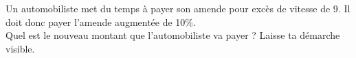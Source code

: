 %
%
    Un automobiliste met du temps à payer son amende pour excès de vitesse de \SI{9}{\sieuro}. Il doit donc payer l'amende augmentée de 10\%.\\
    Quel est le nouveau montant que l'automobiliste va payer ? Laisse ta démarche visible.\vspace*{3cm}
